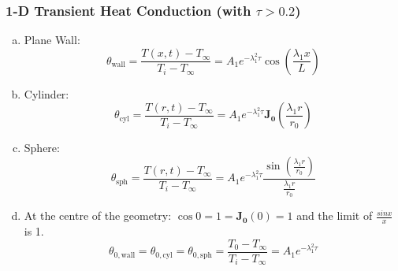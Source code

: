 \documentclass[10pt,compress,unknownkeysallowed]{beamer}
\newcommand{\frc}{\displaystyle\frac}
\begin{document}
\begin{frame}
 \frametitle{1-D Transient Heat Conduction (with $\tau > 0.2$)}
   \begin{enumerate}[(a)]%
     \item<1-> Plane Wall:
        \begin{equation}
           \theta_{\text{wall}} = \frc{T(x,t)-T_{\infty}}{T_{i}-T_{\infty}}= A_{1}e^{-\lambda_{1}^{2}\tau}\cos{\left(\frc{\lambda_{1}x}{L}\right)}\label{analytical:wall}
        \end{equation}
     \item<2-> Cylinder:
        \begin{equation}
           \theta_{\text{cyl}} = \frc{T(r,t)-T_{\infty}}{T_{i}-T_{\infty}}= A_{1}e^{-\lambda_{1}^{2}\tau}\mathbf{J_{0}}\left(\frc{\lambda_{1}r}{r_{0}}\right)\label{analytical:cylinder}
        \end{equation}
     \item<3-> Sphere:
        \begin{equation}
           \theta_{\text{sph}} = \frc{T(r,t)-T_{\infty}}{T_{i}-T_{\infty}}= A_{1}e^{-\lambda_{1}^{2}\tau}\frc{\sin{\left(\frc{\lambda_{1}r}{r_{0}}\right)}}{\frc{\lambda_{1}r}{r_{0}}}\label{analytical:sphere}
        \end{equation}

     \item<4-> At the centre of the geometry: $\cos{0}=1=\mathbf{J_{0}}(0)=1$ and the limit of $\frac{sin{x}}{x}$ is 1.
         \begin{equation}
             \theta_{0,\text{wall}} = \theta_{0,\text{cyl}} = \theta_{0,\text{sph}} = \frc{T_{0}-T_{\infty}}{T_{i}-T_{\infty}} = A_{1}e^{-\lambda_{1}^{2}\tau}
         \end{equation}
   \end{enumerate} 

\end{frame}
\end{document}

